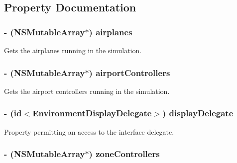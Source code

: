 \subsection{\-Property \-Documentation}
\hypertarget{interface_environment_a59a7f74390b883720a224468155bf5f8}{
\subsubsection[{airplanes}]{\setlength{\rightskip}{0pt plus 5cm}-\/ (\-N\-S\-Mutable\-Array$\ast$) airplanes}}
\label{interface_environment_a59a7f74390b883720a224468155bf5f8}
\-Gets the airplanes running in the simulation. \hypertarget{interface_environment_a82e2d51cea5f8cbbbcfc968348d1b9be}{
\subsubsection[{airport\-Controllers}]{\setlength{\rightskip}{0pt plus 5cm}-\/ (\-N\-S\-Mutable\-Array$\ast$) airport\-Controllers}}
\label{interface_environment_a82e2d51cea5f8cbbbcfc968348d1b9be}
\-Gets the airport controllers running in the simulation. \hypertarget{interface_environment_a424601815b84dea769a7ffbaab1289bf}{
\subsubsection[{display\-Delegate}]{\setlength{\rightskip}{0pt plus 5cm}-\/ (id$<${\bf \-Environment\-Display\-Delegate}$>$) display\-Delegate}}
\label{interface_environment_a424601815b84dea769a7ffbaab1289bf}
\-Property permitting an access to the interface delegate. \hypertarget{interface_environment_a3d62231f10bae1d800466e43bfcc2da7}{
\subsubsection[{zone\-Controllers}]{\setlength{\rightskip}{0pt plus 5cm}-\/ (\-N\-S\-Mutable\-Array$\ast$) zone\-Controllers}}
